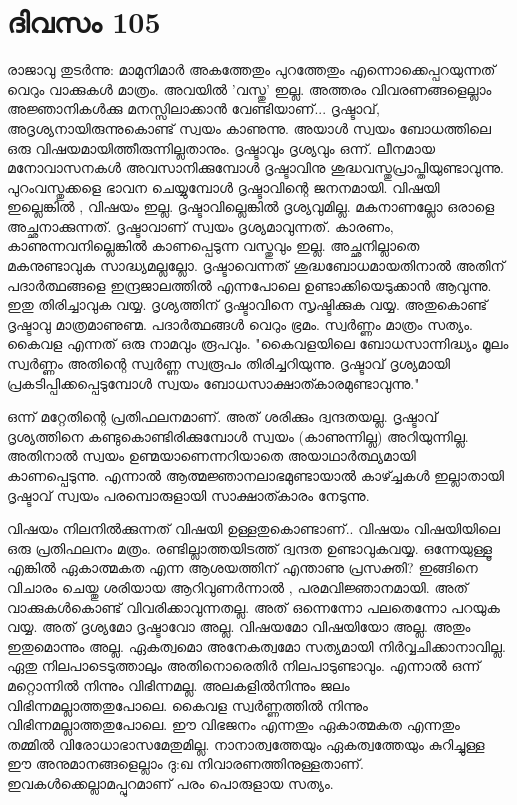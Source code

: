  
\section{ദിവസം 105}


രാജാവു തുടര്‍ന്നു: മാമുനിമാര്‍ അകത്തേതും പുറത്തേതും എന്നൊക്കെപ്പറയുന്നത്‌ വെറും വാക്കുകള്‍ മാത്രം. അവയില്‍ 'വസ്തു' ഇല്ല. അത്തരം വിവരണങ്ങളെല്ലാം അജ്ഞാനികള്‍ക്കു മനസ്സിലാക്കാന്‍ വേണ്ടിയാണ്‌... ദൃഷ്ടാവ്‌, അദൃശ്യനായിരുന്നുകൊണ്ട്‌ സ്വയം കാണുന്നു. അയാള്‍ സ്വയം ബോധത്തിലെ ഒരു വിഷയമായിത്തീരുന്നില്ലതാനും. ദൃഷ്ടാവും ദൃശ്യവും ഒന്ന്. ലീനമായ മനോവാസനകള്‍ അവസാനിക്കുമ്പോള്‍ ദൃഷ്ടാവിനു ശുദ്ധവസ്തുപ്രാപ്തിയുണ്ടാവുന്നു. പുറംവസ്തുക്കളെ ഭാവന ചെയ്യുമ്പോള്‍ ദൃഷ്ടാവിന്റെ ജനനമായി. വിഷയി ഇല്ലെങ്കില്‍ , വിഷയം ഇല്ല. ദൃഷ്ടാവില്ലെങ്കില്‍ ദൃശ്യവുമില്ല. മകനാണല്ലോ ഒരാളെ അച്ഛനാക്കുന്നത്‌. ദൃഷ്ടാവാണ്‌ സ്വയം ദൃശ്യമാവുന്നത്‌. കാരണം, കാണുന്നവനില്ലെങ്കില്‍ കാണപ്പെടുന്ന വസ്തുവും ഇല്ല. അച്ഛനില്ലാതെ മകനുണ്ടാവുക സാദ്ധ്യമല്ലല്ലോ. ദൃഷ്ടാവെന്നത്‌ ശുദ്ധബോധമായതിനാല്‍ അതിന്‌ പദാര്‍ത്ഥങ്ങളെ ഇന്ദ്രജാലത്തില്‍ എന്നപോലെ ഉണ്ടാക്കിയെടുക്കാന്‍ ആവുന്നു. ഇതു തിരിച്ചാവുക വയ്യ. ദൃശ്യത്തിന്‌ ദൃഷ്ടാവിനെ സൃഷ്ടിക്കുക വയ്യ. അതുകൊണ്ട്‌ ദൃഷ്ടാവു മാത്രമാണുണ്മ. പദാര്‍ത്ഥങ്ങള്‍ വെറും ഭ്രമം. സ്വര്‍ണ്ണം മാത്രം സത്യം. കൈവള എന്നത്‌ ഒരു നാമവും രൂപവും. "കൈവളയിലെ ബോധസാന്നിദ്ധ്യം മൂലം സ്വര്‍ണ്ണം അതിന്റെ സ്വര്‍ണ്ണ സ്വരൂപം തിരിച്ചറിയുന്നു. ദൃഷ്ടാവ്‌ ദൃശ്യമായി പ്രകടിപ്പിക്കപ്പെടുമ്പോള്‍ സ്വയം ബോധസാക്ഷാത്കാരമുണ്ടാവുന്നു."

ഒന്ന് മറ്റേതിന്റെ പ്രതിഫലനമാണ്‌. അത്‌ ശരിക്കും ദ്വന്ദതയല്ല. ദൃഷ്ടാവ്‌ ദൃശ്യത്തിനെ കണ്ടുകൊണ്ടിരിക്കുമ്പോള്‍ സ്വയം (കാണുന്നില്ല) അറിയുന്നില്ല. അതിനാല്‍ സ്വയം ഉണ്മയാണെന്നറിയാതെ അയാഥാര്‍ത്ഥ്യമായി കാണപ്പെടുന്നു. എന്നാല്‍ ആത്മജ്ഞാനലാഭമുണ്ടായാല്‍ കാഴ്ച്ചകള്‍ ഇല്ലാതായി ദൃഷ്ടാവ്‌ സ്വയം പരമ്പൊരുളായി സാക്ഷാത്കാരം നേടുന്നു.

വിഷയം നിലനില്‍ക്കുന്നത്‌ വിഷയി ഉള്ളതുകൊണ്ടാണ്‌.. വിഷയം വിഷയിയിലെ ഒരു പ്രതിഫലനം മത്രം. രണ്ടില്ലാത്തയിടത്ത്‌ ദ്വന്ദത ഉണ്ടാവുകവയ്യ. ഒന്നേയുള്ളൂ എങ്കില്‍ ഏകാത്മകത എന്ന ആശയത്തിന്‌ എന്താണു പ്രസക്തി? ഇങ്ങിനെ വിചാരം ചെയ്തു ശരിയായ ആറിവുണര്‍ന്നാല്‍ , പരമവിജ്ഞാനമായി. അത്‌ വാക്കുകള്‍കൊണ്ട്‌ വിവരിക്കാവുന്നതല്ല. അത്‌ ഒന്നെന്നോ പലതെന്നോ പറയുക വയ്യ. അത്‌ ദൃശ്യമോ ദൃഷ്ടാവോ അല്ല. വിഷയമോ വിഷയിയോ അല്ല. അതും ഇതുമൊന്നും അല്ല. ഏകത്വമൊ അനേകത്വമോ സത്യമായി നിര്‍വ്വചിക്കാനാവില്ല. ഏതു നിലപാടെടുത്താലും അതിനൊരെതിര്‍ നിലപാടുണ്ടാവും. എന്നാല്‍ ഒന്ന് മറ്റൊന്നില്‍ നിന്നും വിഭിന്നമല്ല. അലകളില്‍നിന്നും ജലം വിഭിന്നമല്ലാത്തതുപോലെ. കൈവള സ്വര്‍ണ്ണത്തില്‍ നിന്നും വിഭിന്നമല്ലാത്തതുപോലെ. ഈ വിഭജനം എന്നതും ഏകാത്മകത എന്നതും തമ്മില്‍ വിരോധാഭാസമേതുമില്ല. നാനാത്വത്തേയും ഏകത്വത്തേയും കുറിച്ചുള്ള ഈ അനുമാനങ്ങളെല്ലാം ദു:ഖ നിവാരണത്തിനുള്ളതാണ്‌. ഇവകള്‍ക്കെല്ലാമപ്പുറമാണ്‌ പരം പൊരുളായ സത്യം.

